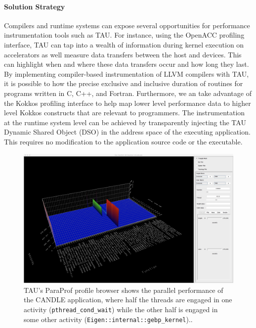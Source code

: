 \paragraph{Solution Strategy} Compilers and runtime systems can expose several opportunities for performance instrumentation tools such as TAU.  For instance, using the OpenACC profiling interface, TAU can tap into a wealth of information during kernel execution on accelerators as well measure data transfers between the host and devices. This can highlight when and where these data transfers occur and how long they last.  By implementing compiler-based instrumentation of LLVM compilers with TAU, it is possible to how the precise exclusive and inclusive duration of routines for programs written in C, C++, and Fortran.  Furthermore, we an take advantage of the Kokkos profiling interface to help map lower level performance data to higher level Kokkos constructs that are relevant to programmers. The instrumentation at the runtime system level can be achieved by transparently injecting the TAU Dynamic Shared Object (DSO) in the address space of the executing application. This requires no modification to the application source code or the executable. 

\begin{figure}[htb]
\centering
\includegraphics[width=6in]{projects/2.3.2-Tools/2.3.2.09-PROTEAS/tau-3d-candle}
\caption{
  TAU's ParaProf profile browser shows the parallel performance of the CANDLE application, where half the threads are engaged in one activity (\texttt{pthread\_cond\_wait}) while the other half is engaged in some other activity (\texttt{Eigen::internal::gebp\_kernel})..
}
\label{figure:tau}
\end{figure}

